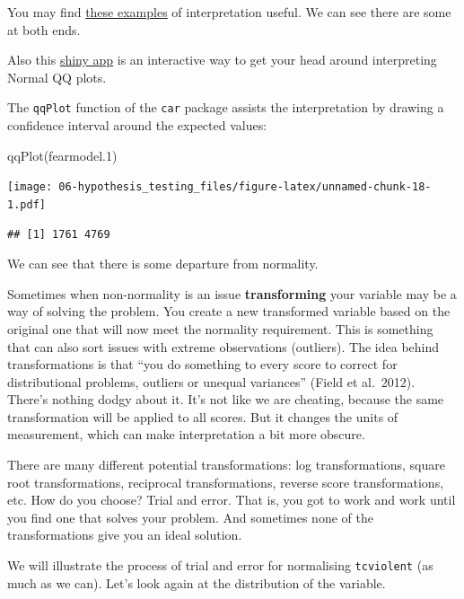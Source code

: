 \documentclass[
]{book}
\newenvironment{Shaded}{\begin{snugshade}}{\end{snugshade}}
\newcommand{\FloatTok}[1]{\textcolor[rgb]{0.00,0.00,0.81}{#1}}
\newcommand{\FunctionTok}[1]{\textcolor[rgb]{0.00,0.00,0.00}{#1}}
\newcommand{\NormalTok}[1]{#1}
\begin{document}
You may find \href{http://emp.byui.edu/BrownD/Stats-intro/dscrptv/graphs/qq-plot_egs.htm}{these examples} of interpretation useful. We can see there are some at both ends.

Also this \href{https://xiongge.shinyapps.io/QQplots/}{shiny app} is an interactive way to get your head around interpreting Normal QQ plots.

The \texttt{qqPlot} function of the \texttt{car} package assists the interpretation by drawing a confidence interval around the expected values:

\begin{Shaded}
\begin{Highlighting}[]
\FunctionTok{qqPlot}\NormalTok{(fearmodel}\FloatTok{.1}\NormalTok{)}
\end{Highlighting}
\end{Shaded}

\texttt{[image: 06-hypothesis\_testing\_files/figure-latex/unnamed-chunk-18-1.pdf]}

\begin{verbatim}
## [1] 1761 4769
\end{verbatim}

We can see that there is some departure from normality.

Sometimes when non-normality is an issue \textbf{transforming} your variable may be a way of solving the problem. You create a new transformed variable based on the original one that will now meet the normality requirement. This is something that can also sort issues with extreme observations (outliers). The idea behind transformations is that ``you do something to every score to correct for distributional problems, outliers or unequal variances'' (Field et al.~2012). There's nothing dodgy about it. It's not like we are cheating, because the same transformation will be applied to all scores. But it changes the units of measurement, which can make interpretation a bit more obscure.

There are many different potential transformations: log transformations, square root transformations, reciprocal transformations, reverse score transformations, etc. How do you choose? Trial and error. That is, you got to work and work until you find one that solves your problem. And sometimes none of the transformations give you an ideal solution.

We will illustrate the process of trial and error for normalising \texttt{tcviolent} (as much as we can). Let's look again at the distribution of the variable.
\end{document}
